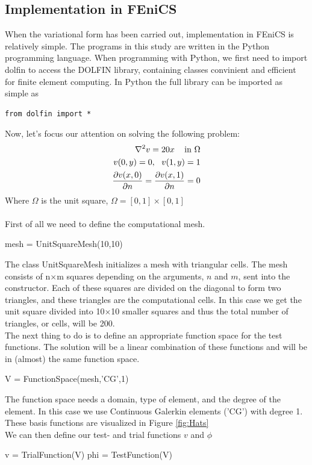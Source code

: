 \subsection{Implementation in FEniCS}
When the variational form has been carried out, implementation in FEniCS is relatively simple. The programs in this study are written in the Python programming language. When programming with Python, we first need to import dolfin to access the DOLFIN library, containing classes convinient and efficient for finite element computing. In Python the full library can be imported as simple as 
\begin{verbatim}
from dolfin import *
\end{verbatim}
Now, let's focus our attention on solving the following problem:
\begin{align}
\nabla^2v = 20x \,\,\,\,\, \text{ in } \Omega \\
v(0,y) = 0, \,\,\,\, v(1,y) = 1 \\
\frac{\partial v(x,0)}{\partial n} = \frac{\partial v(x,1)}{\partial n} = 0
\end{align}
Where $\Omega$ is the unit square, $\Omega = [0,1] \times [0,1]$ \\
\\
First of all we need to define the computational mesh.
\begin{cverbatim}
mesh = UnitSquareMesh(10,10)
\end{cverbatim}
The class UnitSquareMesh initializes a mesh with triangular cells. The mesh consists of n$\times$m squares depending on the arguments, $n$ and $m$, sent into the constructor. Each of these squares are divided on the diagonal to form two triangles, and these triangles are the computational cells. In this case we get the unit square divided into 10$\times$10 smaller squares and thus the total number of triangles, or cells, will be 200. \\
The next thing to do is to define an appropriate function space for the test functions. The solution will be a linear combination of these functions and will be in (almost) the same function space. 
\begin{cverbatim}
V = FunctionSpace(mesh,'CG',1)
\end{cverbatim}
The function space needs a domain, type of element, and the degree of the element. In this case we use Continuous Galerkin elements ('CG') with degree 1. These basis functions are visualized in Figure \ref{fig:Hats}
\\ We can then define our test- and trial functions $v$ and $\phi$
\begin{cverbatim}
v = TrialFunction(V)
phi = TestFunction(V)
\end{cverbatim}
